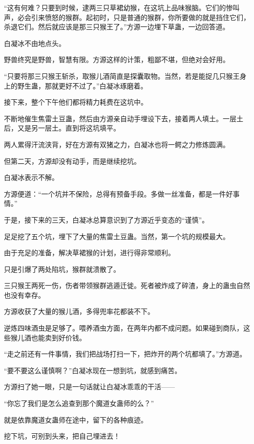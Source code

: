 \begin{this_body}
“这有何难？只要到时候，逮两三只草裙幼猴，在这坑上品味猴脑。它们的惨叫声，必会引来愤怒的猴群。起初时，只是普通的猴群，你所要做的就是挡住它们，杀退它们。然后就应该是那三只猴王了。”方源一边埋下草蛊，一边回答道。

白凝冰不由地点头。

野兽终究是野兽，智慧有限。方源这样的计策，粗鄙不堪，但绝对会好用。

“只要将那三只猴王斩杀，取猴儿酒简直是探囊取物。当然，若是能捉几只猴王身上的野生蛊，那就更好不过了。”白凝冰琢磨着。

接下来，整个下午他们都将精力耗费在这坑中。

不断地催生焦雷土豆蛊，然后由方源亲自动手埋设下去，接着两人填土。一层土后，又是另一层土。直到将这坑填平。

两人累得汗流浃背，好在方源有双猪之力，白凝冰也将一鳄之力修炼圆满。

但第二天，方源却没有动手，而是继续挖坑。

白凝冰表示不解。

方源便道：“一个坑并不保险，总得有预备手段。多做一丝准备，都是一件好事情。”

于是，接下来的三天，白凝冰总算意识到了方源近乎变态的“谨慎”。

足足挖了五个坑，埋下了大量的焦雷土豆蛊。当然，第一个坑的规模最大。

由于充足的准备，解决草裙猴的计划，进行得非常顺利。

只是引爆了两处陷坑，猴群就溃散了。

三只猴王两死一伤，伤者带领猴群逃遁迁徙。死者被炸成了碎渣，身上的蛊虫自然也没有幸存。

方源收获了大量的猴儿酒，多得兜率花都装不下。

逆炼四味酒虫是足够了。喂养酒虫方面，在两年内都不成问题。如果碰到商队，这些猴儿酒也能卖到好价钱。

“走之前还有一件事情，我们把战场打扫一下，把炸开的两个坑都填了。”方源道。

“要不要这么谨慎啊？”白凝冰现在一想到坑，就感到痛苦。

方源扫了她一眼，只是一句话就让白凝冰乖乖的干活——

“你忘了我们是怎么追查到那个魔道女蛊师的么？”

就是依靠魔道女蛊师在途中，留下的各种痕迹。

挖下坑，可别到头来，把自己埋进去！

\end{this_body}


